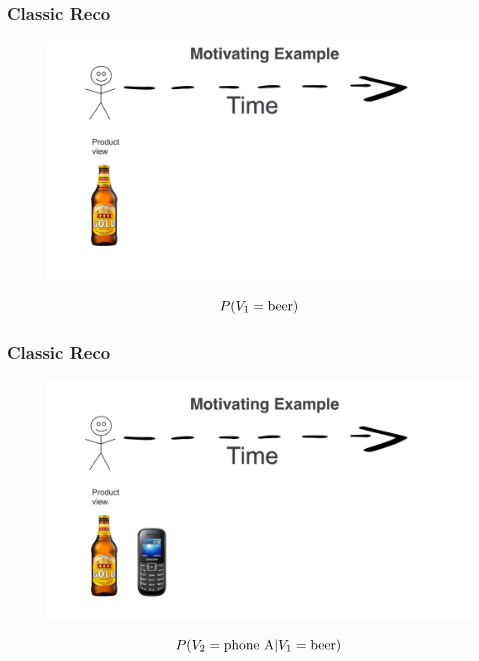  \begin{frame}
  \frametitle{Classic Reco}
 
 
   \begin{figure}[h!]
     \includegraphics[scale=0.25]{images/mot_ex1a.png}
       \centering
       \label{motex1}
   \end{figure}

   \[
   P(V_1 = {\rm beer})  
   \]
 \end{frame}


\begin{frame}
  \frametitle{Classic Reco}
 
 
   \begin{figure}[h!]
     \includegraphics[scale=0.25]{images/mot_ex1b.png}
       \centering
       \label{motex1}
   \end{figure}
   \[
   P(V_2 = {\rm phone ~ A} | V_1 = {\rm beer})  
   \]
     
 \end{frame}


